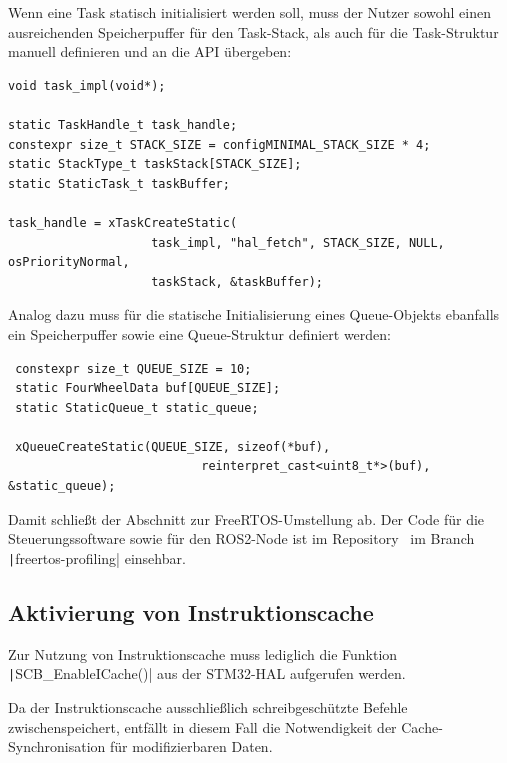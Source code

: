 Wenn eine Task statisch initialisiert werden soll, muss der Nutzer sowohl einen
ausreichenden Speicherpuffer für den Task-Stack, als auch für die Task-Struktur
manuell definieren und an die API übergeben:

\begin{code}
\begin{verbatim}
void task_impl(void*);

static TaskHandle_t task_handle;
constexpr size_t STACK_SIZE = configMINIMAL_STACK_SIZE * 4;
static StackType_t taskStack[STACK_SIZE];
static StaticTask_t taskBuffer;

task_handle = xTaskCreateStatic(
                    task_impl, "hal_fetch", STACK_SIZE, NULL, osPriorityNormal,
                    taskStack, &taskBuffer);
\end{verbatim}
\end{code}

Analog dazu muss für die statische Initialisierung eines Queue-Objekts ebanfalls
ein Speicherpuffer sowie eine Queue-Struktur definiert werden:

\begin{code}
\begin{verbatim}
 constexpr size_t QUEUE_SIZE = 10;
 static FourWheelData buf[QUEUE_SIZE];
 static StaticQueue_t static_queue;

 xQueueCreateStatic(QUEUE_SIZE, sizeof(*buf),
                           reinterpret_cast<uint8_t*>(buf), &static_queue);
\end{verbatim}
\end{code}

Damit schließt der Abschnitt zur FreeRTOS-Umstellung ab. Der Code für die
Steuerungssoftware sowie für den ROS2-Node ist im
Repository~\cite{mecarover_freertos_profiling} im Branch
\texttt|freertos-profiling| einsehbar.

\subsection{Aktivierung von Instruktionscache}

Zur Nutzung von Instruktionscache muss lediglich die Funktion
\texttt|SCB_EnableICache()| aus der STM32-HAL aufgerufen werden.

Da der Instruktionscache ausschließlich schreibgeschützte Befehle
zwischenspeichert, entfällt in diesem Fall die Notwendigkeit der
Cache-Synchronisation für modifizierbaren Daten.

